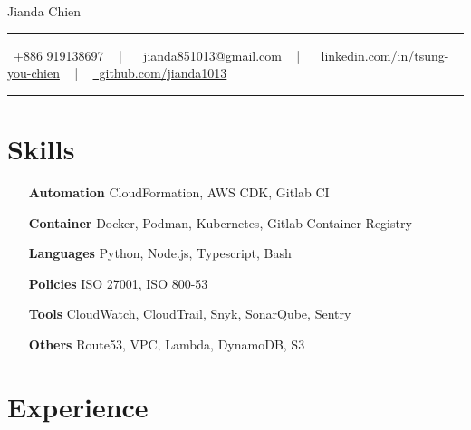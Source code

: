 \documentclass[letterpaper,10pt]{article}
\newcommand{\documentTitle}[2]{
  \begin{center}
	{\Huge\color{accentTitle} #1}
	\vspace{10pt}
	{\color{accentLine} \hrule}
	\vspace{2pt}
	\footnotesize{#2}
	\vspace{2pt}
	{\color{accentLine} \hrule}
  \end{center}
}
\begin{document}

  \documentTitle{Jianda Chien}{
	\href{tel:+886 919138697}{
	  \raisebox{-0.05\height} \faPhone\ +886 919138697} ~ | ~
	\href{mailto:jianda851013@gmail.com}{
	  \raisebox{-0.15\height} \faEnvelope\ jianda851013@gmail.com} ~ | ~
	\href{https://www.linkedin.com/in/tsung-you-chien-66ba471bb/}{
	  \raisebox{-0.15\height} \faLinkedin\ linkedin.com/in/tsung-you-chien} ~ | ~
	\href{https://github.com/jianda1013}{
	  \raisebox{-0.15\height} \faGithub\ github.com/jianda1013}
  }


  \section{Skills}

  \begin{multicols}{2}
	\begin{itemize}[itemsep=2px, parsep=1pt, leftmargin=75pt]
	  \item[\textbf{Automation}] CloudFormation, AWS CDK, Gitlab CI
	  \item[\textbf{Container}] Docker, Podman, Kubernetes, Gitlab Container Registry
	  \item[\textbf{Languages}] Python, Node.js, Typescript, Bash
	  \item[\textbf{Policies}] ISO 27001, ISO 800-53
	  \item[\textbf{Tools}] CloudWatch, CloudTrail, Snyk, SonarQube, Sentry
	  \item[\textbf{Others}] Route53, VPC, Lambda, DynamoDB, S3
	\end{itemize}
  \end{multicols}


  \section{Experience}
\end{document}
